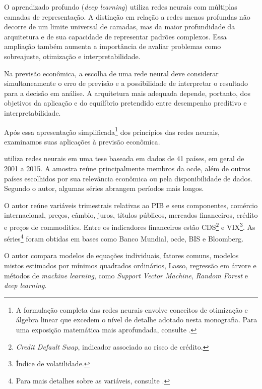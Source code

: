 
O aprendizado profundo (\textit{deep learning}) utiliza redes neurais com múltiplas camadas de representação. A distinção em relação a redes menos profundas não decorre de um limite universal de camadas, mas da maior profundidade da arquitetura e de sua capacidade de representar padrões complexos. Essa ampliação também aumenta a importância de avaliar problemas como sobreajuste, otimização e interpretabilidade.

Na previsão econômica, a escolha de uma rede neural deve considerar simultaneamente o erro de previsão e a possibilidade de interpretar o resultado para a decisão em análise. A arquitetura mais adequada depende, portanto, dos objetivos da aplicação e do equilíbrio pretendido entre desempenho preditivo e interpretabilidade.

Após essa apresentação simplificada\footnote{A formulação completa das redes neurais envolve conceitos de otimização e álgebra linear que excedem o nível de detalhe adotado nesta monografia. Para uma exposição matemática mais aprofundada, consulte .} dos princípios das redes neurais, examinamos suas aplicações à previsão econômica.

 utiliza redes neurais em uma tese baseada em dados de 41 países, em geral de 2001 a 2015. A amostra reúne principalmente membros da \ac{ocde}, além de outros países escolhidos por sua relevância econômica ou pela disponibilidade de dados. Segundo o autor, algumas séries abrangem períodos mais longos.

O autor reúne variáveis trimestrais relativas ao PIB e seus componentes, comércio internacional, preços, câmbio, juros, títulos públicos, mercados financeiros, crédito e preços de commodities. Entre os indicadores financeiros estão CDS\footnote{\textit{Credit Default Swap}, indicador associado ao risco de crédito.} e VIX\footnote{Índice de volatilidade.}. As séries\footnote{Para mais detalhes sobre as variáveis, consulte .} foram obtidas em bases como Banco Mundial, \ac{ocde}, BIS e Bloomberg.

O autor compara modelos de equações individuais, fatores comuns, modelos mistos estimados por mínimos quadrados ordinários, Lasso, regressão em árvore e métodos de \textit{machine learning}, como \textit{Support Vector Machine}, \textit{Random Forest} e \textit{deep learning}.

